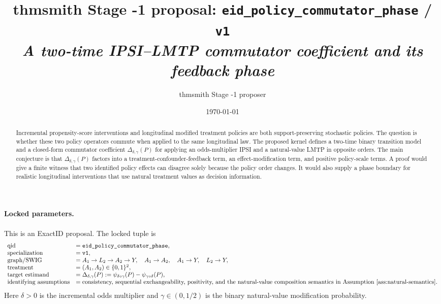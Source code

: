 \documentclass[11pt]{article}
\title{thmsmith Stage -1 proposal: \texttt{eid\_policy\_commutator\_phase} / \texttt{v1}%
  \\ \large\textit{A two-time IPSI--LMTP commutator coefficient and its feedback phase}}
\author{thmsmith Stage -1 proposer}
\date{\today}
\theoremstyle{definition}
\theoremstyle{plain}
\theoremstyle{remark}
\begin{document}
\maketitle


\paragraph{Locked parameters.}
This is an ExactID proposal. The locked tuple is
\[
\begin{array}{ll}
\text{qid} & = \texttt{eid\_policy\_commutator\_phase},\\
\text{specialization} & = \texttt{v1},\\
\text{graph/SWIG} & = A_1 \to L_2 \to A_2 \to Y,\quad A_1 \to A_2,\quad A_1 \to Y,\quad L_2 \to Y,\\
\text{treatment} & = (A_1,A_2)\in\{0,1\}^2,\\
\text{target estimand} & =
\Delta_{\delta,\gamma}(P):=\psi_{\delta\circ\gamma}(P)-\psi_{\gamma\circ\delta}(P),\\
\text{identifying assumptions} & =
\text{consistency, sequential exchangeability, positivity, and the natural-value composition semantics in Assumption \ref{ass:natural-semantics}.}
\end{array}
\]
Here \(\delta>0\) is the incremental odds multiplier and \(\gamma\in(0,1/2)\) is the binary natural-value modification probability.

\begin{abstract}
Incremental propensity-score interventions and longitudinal modified treatment policies are both support-preserving stochastic policies. The question is whether these two policy operators commute when applied to the same longitudinal law. The proposed kernel defines a two-time binary transition model and a closed-form commutator coefficient \(\Delta_{\delta,\gamma}(P)\) for applying an odds-multiplier IPSI and a natural-value LMTP in opposite orders. The main conjecture is that \(\Delta_{\delta,\gamma}(P)\) factors into a treatment-confounder-feedback term, an effect-modification term, and positive policy-scale terms. A proof would give a finite witness that two identified policy effects can disagree solely because the policy order changes. It would also supply a phase boundary for realistic longitudinal interventions that use natural treatment values as decision information.
\end{abstract}
\end{document}
